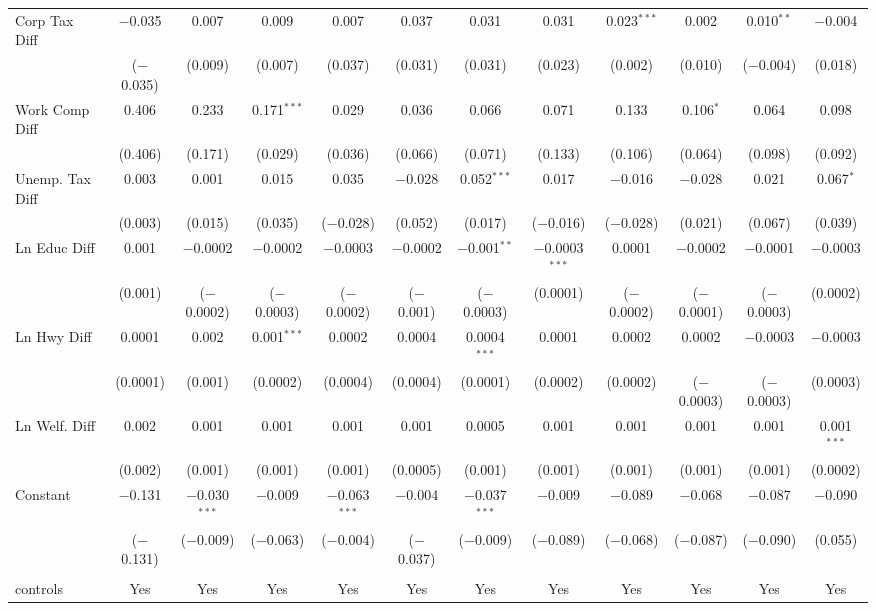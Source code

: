 \begin{table}[!htbp]
\begin{tabular}{@{\extracolsep{5pt}}lccccccccccc}
  Corp Tax Diff & $-$0.035 & 0.007 & 0.009 & 0.007 & 0.037 & 0.031 & 0.031 & 0.023$^{***}$ & 0.002 & 0.010$^{**}$ & $-$0.004 \\ 
  & ($-$0.035) & (0.009) & (0.007) & (0.037) & (0.031) & (0.031) & (0.023) & (0.002) & (0.010) & ($-$0.004) & (0.018) \\ 
  Work Comp Diff & 0.406 & 0.233 & 0.171$^{***}$ & 0.029 & 0.036 & 0.066 & 0.071 & 0.133 & 0.106$^{*}$ & 0.064 & 0.098 \\ 
  & (0.406) & (0.171) & (0.029) & (0.036) & (0.066) & (0.071) & (0.133) & (0.106) & (0.064) & (0.098) & (0.092) \\ 
  Unemp. Tax Diff & 0.003 & 0.001 & 0.015 & 0.035 & $-$0.028 & 0.052$^{***}$ & 0.017 & $-$0.016 & $-$0.028 & 0.021 & 0.067$^{*}$ \\ 
  & (0.003) & (0.015) & (0.035) & ($-$0.028) & (0.052) & (0.017) & ($-$0.016) & ($-$0.028) & (0.021) & (0.067) & (0.039) \\ 
  Ln Educ Diff & 0.001 & $-$0.0002 & $-$0.0002 & $-$0.0003 & $-$0.0002 & $-$0.001$^{**}$ & $-$0.0003$^{***}$ & 0.0001 & $-$0.0002 & $-$0.0001 & $-$0.0003 \\ 
  & (0.001) & ($-$0.0002) & ($-$0.0003) & ($-$0.0002) & ($-$0.001) & ($-$0.0003) & (0.0001) & ($-$0.0002) & ($-$0.0001) & ($-$0.0003) & (0.0002) \\ 
  Ln Hwy Diff & 0.0001 & 0.002 & 0.001$^{***}$ & 0.0002 & 0.0004 & 0.0004$^{***}$ & 0.0001 & 0.0002 & 0.0002 & $-$0.0003 & $-$0.0003 \\ 
  & (0.0001) & (0.001) & (0.0002) & (0.0004) & (0.0004) & (0.0001) & (0.0002) & (0.0002) & ($-$0.0003) & ($-$0.0003) & (0.0003) \\ 
  Ln Welf. Diff & 0.002 & 0.001 & 0.001 & 0.001 & 0.001 & 0.0005 & 0.001 & 0.001 & 0.001 & 0.001 & 0.001$^{***}$ \\ 
  & (0.002) & (0.001) & (0.001) & (0.001) & (0.0005) & (0.001) & (0.001) & (0.001) & (0.001) & (0.001) & (0.0002) \\ 
  Constant & $-$0.131 & $-$0.030$^{***}$ & $-$0.009 & $-$0.063$^{***}$ & $-$0.004 & $-$0.037$^{***}$ & $-$0.009 & $-$0.089 & $-$0.068 & $-$0.087 & $-$0.090 \\ 
  & ($-$0.131) & ($-$0.009) & ($-$0.063) & ($-$0.004) & ($-$0.037) & ($-$0.009) & ($-$0.089) & ($-$0.068) & ($-$0.087) & ($-$0.090) & (0.055) \\ 
 \hline \\[-1.8ex] 
controls & Yes & Yes & Yes & Yes & Yes & Yes & Yes & Yes & Yes & Yes & Yes \\ 

\end{tabular}
\end{table}
